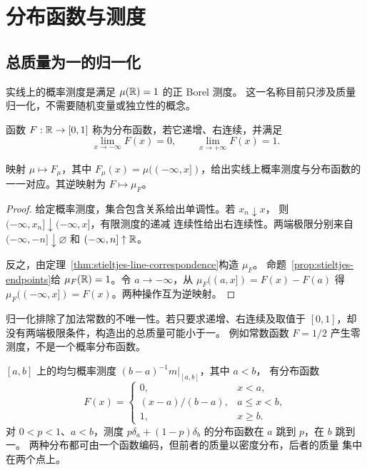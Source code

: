 \section{分布函数与测度}
\label{sec:stieltjes-distribution-functions}

\subsection{总质量为一的归一化}

实线上的概率测度是满足 \(\mu(\mathbb{R})=1\) 的正 Borel 测度。
这一名称目前只涉及质量归一化，不需要随机变量或独立性的概念。

\begin{definition}\label{def:stieltjes-cdf}
函数 \(F:\mathbb{R}\to[0,1]\) 称为分布函数，若它递增、右连续，并满足
\[
 \lim_{x\to-\infty}F(x)=0,\qquad
 \lim_{x\to+\infty}F(x)=1.
\]
\end{definition}

\begin{theorem}\label{thm:stieltjes-cdf-correspondence}
映射 \(\mu\mapsto F_\mu\)，其中
\(F_\mu(x)=\mu(({-\infty},x])\)，给出实线上概率测度与分布函数的
一一对应。其逆映射为 \(F\mapsto\mu_F\)。
\end{theorem}
\begin{proof}
给定概率测度，集合包含关系给出单调性。若 \(x_n\downarrow x\)，
则 \(({-\infty},x_n]\downarrow({-\infty},x]\)，有限测度的递减
连续性给出右连续性。两端极限分别来自
\(({-\infty},-n]\downarrow\varnothing\) 和
\(({-\infty},n]\uparrow\mathbb{R}\)。

反之，由定理~\ref{thm:stieltjes-line-correspondence}构造 \(\mu_F\)。
命题~\ref{prop:stieltjes-endpoints}给 \(\mu_F(\mathbb{R})=1\)。令
\(a\to-\infty\)，从 \(\mu_F((a,x])=F(x)-F(a)\) 得
\(\mu_F(({-\infty},x])=F(x)\)。两种操作互为逆映射。
\end{proof}

归一化排除了加法常数的不唯一性。若只要求递增、右连续及取值于
\([0,1]\)，却没有两端极限条件，构造出的总质量可能小于一。
例如常数函数 \(F=1/2\) 产生零测度，不是一个概率分布函数。

\begin{example}
\([a,b]\) 上的均匀概率测度 \((b-a)^{-1}m|_{[a,b]}\)，其中 \(a<b\)，
有分布函数
\[
 F(x)=
 \begin{cases}
 0,&x<a,\\
 (x-a)/(b-a),&a\le x<b,\\
 1,&x\ge b.
 \end{cases}
\]
对 \(0<p<1\)、\(a<b\)，测度 \(p\delta_a+(1-p)\delta_b\)
的分布函数在 \(a\) 跳到 \(p\)，在 \(b\) 跳到一。
两种分布都可由一个函数编码，但前者的质量以密度分布，后者的质量
集中在两个点上。
\end{example}

